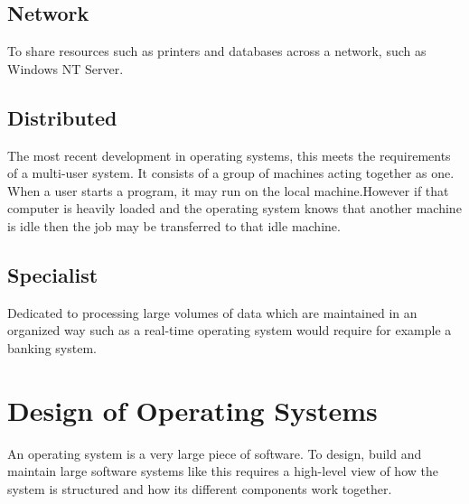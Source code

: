 \subsection*{Network}
To share resources such as printers and databases across a network, such as Windows NT Server.

\subsection*{Distributed}
The most recent development in operating systems, this meets the requirements of a multi-user system. It consists of a group of machines acting together as one. When a user starts a program, it may run on the local machine.However if that computer is heavily loaded and the operating system knows that another machine is idle then the job may be transferred to that idle machine.

\subsection*{Specialist}
Dedicated to processing large volumes of data which are maintained in an organized way such as a real-time operating system would require for example a banking system. 

\section*{Design of Operating Systems}
An operating system is a very large piece of software. To design, build and maintain large software systems like this requires a high-level view of how the system is structured and how its different components work together. 